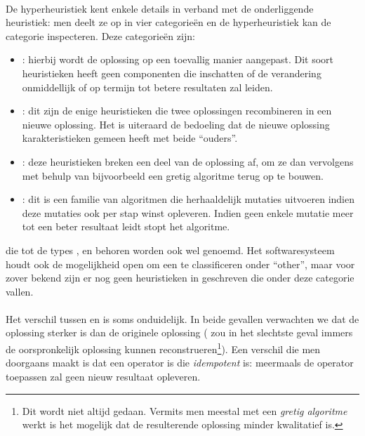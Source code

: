 \paragraph{}
De hyperheuristiek kent enkele details in verband met de onderliggende heuristiek: men deelt ze op in vier categorie\"en en de hyperheuristiek kan de categorie inspecteren. Deze categorie\"en zijn:
\begin{itemize}
 \item \emph{\abmt{}}: hierbij wordt de oplossing op een toevallig manier aangepast. Dit soort heuristieken heeft geen componenten die inschatten of de verandering onmiddellijk of op termijn tot betere resultaten zal leiden.
 \item \emph{\abco{}}: dit zijn de enige heuristieken die twee oplossingen recombineren in een nieuwe oplossing. Het is uiteraard de bedoeling dat de nieuwe oplossing karakteristieken gemeen heeft met beide ``ouders''.
 \item \emph{\abrr{}}: deze heuristieken breken een deel van de oplossing af, om ze dan vervolgens met behulp van bijvoorbeeld een gretig algoritme terug op te bouwen.
 \item \emph{\abls{}}: dit is een familie van algoritmen die herhaaldelijk mutaties uitvoeren indien deze mutaties ook per stap winst opleveren. Indien geen enkele mutatie meer tot een beter resultaat leidt stopt het algoritme.
\end{itemize}
\abllhn[L]{} die tot de types \emph{\abmt{}}, \emph{\abco{}} en \emph{\abrr{}} behoren worden ook wel \emph{\abpts{}} genoemd. Het softwaresysteem houdt ook de mogelijkheid open om een \abllh{} te classificeren onder ``other'', maar voor zover bekend zijn er nog geen heuristieken in \abhf{} geschreven die onder deze categorie vallen.

\paragraph{}
Het verschil tussen \abrr{} en \abls{} is soms onduidelijk. In beide gevallen verwachten we dat de oplossing sterker is dan de originele oplossing (\abrr{} zou in het slechtste geval immers de oorspronkelijk oplossing kunnen reconstrueren\footnote{Dit wordt niet altijd gedaan. Vermits men meestal met een \emph{gretig algoritme} werkt is het mogelijk dat de resulterende oplossing minder kwalitatief is.}). Een verschil die men doorgaans maakt is dat \abls{} een operator is die \emph{idempotent} is: meermaals de operator toepassen zal geen nieuw resultaat opleveren.


